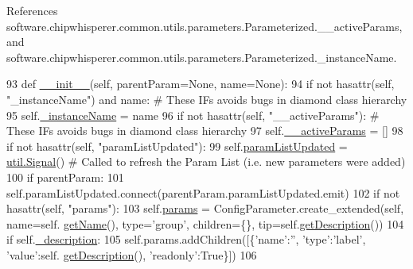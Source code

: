 References software.\+chipwhisperer.\+common.\+utils.\+parameters.\+Parameterized.\+\_\+\+\_\+active\+Params, and software.\+chipwhisperer.\+common.\+utils.\+parameters.\+Parameterized.\+\_\+instance\+Name.


\begin{DoxyCode}
93     \textcolor{keyword}{def }\hyperlink{classsoftware_1_1chipwhisperer_1_1common_1_1utils_1_1parameters_1_1Parameterized_a97793c584f04e1c425d857fb12b5a1e9}{\_\_init\_\_}(self, parentParam=None, name=None):
94         \textcolor{keywordflow}{if} \textcolor{keywordflow}{not} hasattr(self, \textcolor{stringliteral}{"\_instanceName"}) \textcolor{keywordflow}{and} name:  \textcolor{comment}{# These IFs avoids bugs in diamond class hierarchy}
95             self.\hyperlink{classsoftware_1_1chipwhisperer_1_1common_1_1utils_1_1parameters_1_1Parameterized_a002138db68cb21f8138ba054eae6bc36}{\_instanceName} = name
96         \textcolor{keywordflow}{if} \textcolor{keywordflow}{not} hasattr(self, \textcolor{stringliteral}{"\_\_activeParams"}):  \textcolor{comment}{# These IFs avoids bugs in diamond class hierarchy}
97             self.\hyperlink{classsoftware_1_1chipwhisperer_1_1common_1_1utils_1_1parameters_1_1Parameterized_a16aa5ed43c4c5d595ab71f0d0ddc515b}{\_\_activeParams} = []
98         \textcolor{keywordflow}{if} \textcolor{keywordflow}{not} hasattr(self, \textcolor{stringliteral}{"paramListUpdated"}):
99             self.\hyperlink{classsoftware_1_1chipwhisperer_1_1common_1_1utils_1_1parameters_1_1Parameterized_acf38aa3f6634073f4162fba0abf0501c}{paramListUpdated} = \hyperlink{classsoftware_1_1chipwhisperer_1_1common_1_1utils_1_1util_1_1Signal}{util.Signal}()  \textcolor{comment}{# Called to refresh the Param
       List (i.e. new parameters were added)}
100         \textcolor{keywordflow}{if} parentParam:
101             self.paramListUpdated.connect(parentParam.paramListUpdated.emit)
102         \textcolor{keywordflow}{if} \textcolor{keywordflow}{not} hasattr(self, \textcolor{stringliteral}{"params"}):
103             self.\hyperlink{classsoftware_1_1chipwhisperer_1_1common_1_1utils_1_1parameters_1_1Parameterized_a4e79c2f229cc9b366e4d4aa2f584c990}{params} = ConfigParameter.create\_extended(self, name=self.
      \hyperlink{classsoftware_1_1chipwhisperer_1_1common_1_1utils_1_1parameters_1_1Parameterized_aeccedaa63c76d2cb29479e2452ceda15}{getName}(), type=\textcolor{stringliteral}{'group'}, children=\{\}, tip=self.\hyperlink{classsoftware_1_1chipwhisperer_1_1common_1_1utils_1_1parameters_1_1Parameterized_a08d4c450f4f9c798e889141f33a816f1}{getDescription}())
104             \textcolor{keywordflow}{if} self.\hyperlink{classsoftware_1_1chipwhisperer_1_1common_1_1utils_1_1parameters_1_1Parameterized_a98b72447c2df7ba9997b30c309d161b1}{\_description}:
105                 self.params.addChildren([\{\textcolor{stringliteral}{'name'}:\textcolor{stringliteral}{''}, \textcolor{stringliteral}{'type'}:\textcolor{stringliteral}{'label'}, \textcolor{stringliteral}{'value'}:self.
      \hyperlink{classsoftware_1_1chipwhisperer_1_1common_1_1utils_1_1parameters_1_1Parameterized_a08d4c450f4f9c798e889141f33a816f1}{getDescription}(), \textcolor{stringliteral}{'readonly'}:\textcolor{keyword}{True}\}])
106 
\end{DoxyCode}


